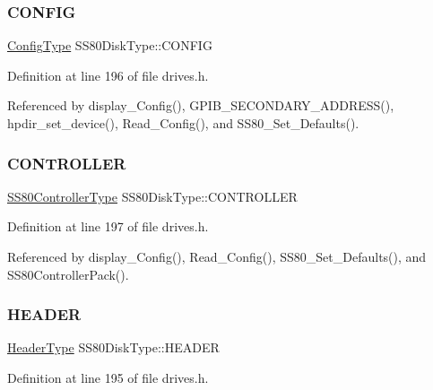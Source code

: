 \subsubsection{\texorpdfstring{C\+O\+N\+F\+IG}{CONFIG}}
{\footnotesize\ttfamily \hyperlink{structConfigType}{Config\+Type} S\+S80\+Disk\+Type\+::\+C\+O\+N\+F\+IG}



Definition at line 196 of file drives.\+h.



Referenced by display\+\_\+\+Config(), G\+P\+I\+B\+\_\+\+S\+E\+C\+O\+N\+D\+A\+R\+Y\+\_\+\+A\+D\+D\+R\+E\+S\+S(), hpdir\+\_\+set\+\_\+device(), Read\+\_\+\+Config(), and S\+S80\+\_\+\+Set\+\_\+\+Defaults().

\mbox{\label{structSS80DiskType_ae9da84cba5786cf755c388eba065c0cd}} 
\subsubsection{\texorpdfstring{C\+O\+N\+T\+R\+O\+L\+L\+ER}{CONTROLLER}}
{\footnotesize\ttfamily \hyperlink{structSS80ControllerType}{S\+S80\+Controller\+Type} S\+S80\+Disk\+Type\+::\+C\+O\+N\+T\+R\+O\+L\+L\+ER}



Definition at line 197 of file drives.\+h.



Referenced by display\+\_\+\+Config(), Read\+\_\+\+Config(), S\+S80\+\_\+\+Set\+\_\+\+Defaults(), and S\+S80\+Controller\+Pack().

\mbox{\label{structSS80DiskType_ae66c0130dee8c362743dfdfc41539c3b}} 
\subsubsection{\texorpdfstring{H\+E\+A\+D\+ER}{HEADER}}
{\footnotesize\ttfamily \hyperlink{structHeaderType}{Header\+Type} S\+S80\+Disk\+Type\+::\+H\+E\+A\+D\+ER}



Definition at line 195 of file drives.\+h.



